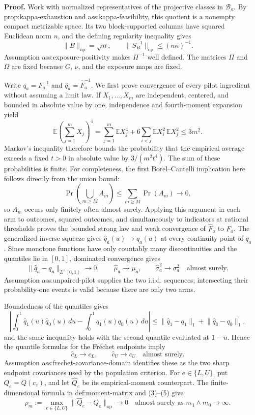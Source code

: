 \textbf{Proof.}
Work with normalized representatives of the projective classes in \(\mathcal B_\kappa\).  By prop:kappa-exhaustion and ass:kappa-feasibility, this quotient is a nonempty compact metrizable space.  Its two block-supported columns have squared Euclidean norm \(n\), and the defining regularity inequality gives
\[
 \lVert B\rVert_{\mathrm{op}}=\sqrt n,
 \qquad
 \lVert S_B^{-1}\rVert_{\mathrm{op}}\le(n\kappa)^{-1}.
 \tag{1}
\]
Assumption ass:exposure-positivity makes \(\Pi^{-1}\) well defined.  The matrices \(\Pi\) and \(\Omega\) are fixed because \(G\), \(\nu\), and the exposure maps are fixed.

Write \(q_a=F_a^{-1}\) and \(\widehat q_a=\widehat F_a^{-1}\).  We first prove convergence of every pilot ingredient without assuming a limit law.  If \(X_1,\ldots,X_m\) are independent, centered, and bounded in absolute value by one, independence and fourth-moment expansion yield
\[
 \mathbb E\!\left(\sum_{j=1}^mX_j\right)^4
 =\sum_{j=1}^m\mathbb EX_j^4
 +6\sum_{i<j}\mathbb EX_i^2\,\mathbb EX_j^2
 \le3m^2.
 \tag{2}
\]
Markov's inequality therefore bounds the probability that the empirical average exceeds a fixed \(t>0\) in absolute value by \(3/(m^2t^4)\).  The sum of these probabilities is finite.  For completeness, the first Borel--Cantelli implication here follows directly from the union bound:
\[
 \Pr\!\left(\bigcup_{m\ge M}A_m\right)
 \le\sum_{m\ge M}\Pr(A_m)\longrightarrow0,
\]
so \(A_m\) occurs only finitely often almost surely.  Applying this argument in each arm to outcomes, squared outcomes, and simultaneously to indicators at rational thresholds proves the bounded strong law and weak convergence of \(\widehat F_a\) to \(F_a\).  The generalized-inverse squeeze gives \(\widehat q_a(u)\to q_a(u)\) at every continuity point of \(q_a\).  Since monotone functions have only countably many discontinuities and the quantiles lie in \([0,1]\), dominated convergence gives
\[
 \lVert\widehat q_a-q_a\rVert_{L^1(0,1)}\longrightarrow0,
 \qquad
 \widehat\mu_a\longrightarrow\mu_a,
 \qquad
 \widehat\sigma_a^2\longrightarrow\sigma_a^2
 \quad\text{almost surely}.
 \tag{3}
\]
Assumption ass:unpaired-pilot supplies the two i.i.d. sequences; intersecting their probability-one events is valid because there are only two arms.

Boundedness of the quantiles gives
\[
 \left|\int_0^1\widehat q_1(u)\widehat q_0(u)\,du
 -\int_0^1q_1(u)q_0(u)\,du\right|
 \le\lVert\widehat q_1-q_1\rVert_1
 +\lVert\widehat q_0-q_0\rVert_1,
 \tag{4}
\]
and the same inequality holds with the second quantile evaluated at \(1-u\).  Hence the quantile formulas for the Fr\'echet endpoints imply
\[
 \widehat c_L\longrightarrow c_L,
 \qquad
 \widehat c_U\longrightarrow c_U
 \quad\text{almost surely}.
 \tag{5}
\]
Assumption ass:frechet-covariance-domain identifies these as the two sharp endpoint covariances used by the population criterion.  For \(e\in\{L,U\}\), put \(Q_e=Q(c_e)\), and let \(\widehat Q_e\) be its empirical-moment counterpart.  The finite-dimensional formula in def:moment-matrix and (3)--(5) give
\[
 \rho_m:=\max_{e\in\{L,U\}}
 \lVert\widehat Q_e-Q_e\rVert_{\mathrm{op}}
 \longrightarrow0
 \quad\text{almost surely as }m_1\wedge m_0\to\infty.
 \tag{6}
\]

